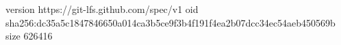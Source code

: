 version https://git-lfs.github.com/spec/v1
oid sha256:dc35a5c1847846650a014ca3b5ce9f3b4f191f4ea2b07dcc34ec54aeb450569b
size 626416
